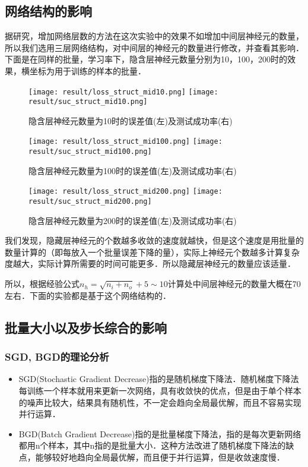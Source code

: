 \documentclass{article}
\begin{document}
  \subsection{网络结构的影响}
  据研究，增加网络层数的方法在这次实验中的效果不如增加中间层神经元的数量，所以我们选用三层网络结构，对中间层的神经元的数量进行修改，并查看其影响．下面是在同样的批量，学习率下，隐含层神经元数量分别为10，100，200时的效果，横坐标为用于训练的样本的批量．

  \begin{figure}
    \centering
    \texttt{[image: result/loss\_struct\_mid10.png]}
    \texttt{[image: result/suc\_struct\_mid10.png]}
    \caption{隐含层神经元数量为10时的误差值(左)及测试成功率(右)}
  \end{figure}
  \begin{figure}
    \centering
    \texttt{[image: result/loss\_struct\_mid100.png]}
    \texttt{[image: result/suc\_struct\_mid100.png]}
    \caption{隐含层神经元数量为100时的误差值(左)及测试成功率(右)}
  \end{figure}
  \begin{figure}
    \centering
    \texttt{[image: result/loss\_struct\_mid200.png]}
    \texttt{[image: result/suc\_struct\_mid200.png]}
    \caption{隐含层神经元数量为200时的误差值(左)及测试成功率(右)}
  \end{figure}
  \restoregeometry

  我们发现，隐藏层神经元的个数越多收敛的速度就越快，但是这个速度是用批量的数量计算的（即每放入一个批量误差下降的量），实际上神经元个数越多计算复杂度越大，实际计算所需要的时间可能更多．所以隐藏层神经元的数量应该适量．

  所以，根据经验公式$n_h = \sqrt{n_i + n_o} + 5\sim10$计算处中间层神经元的数量大概在70左右．下面的实验都是基于这个网络结构的．


  \subsection{批量大小以及步长综合的影响}

  \subsubsection{SGD, BGD的理论分析}

  \begin{itemize}
    \item SGD(Stochastic Gradient Decrease)指的是随机梯度下降法．随机梯度下降法每训练一个样本就用来更新一次网络，具有收敛快的优点，但是由于单个样本的噪声比较大，结果具有随机性，不一定会趋向全局最优解，而且不容易实现并行运算．

    \item BGD(Batch Gradient Decrease)指的是批量梯度下降法，指的是每次更新网络都用n个样本，其中n指的是批量大小．这种方法改进了随机梯度下降法的缺点，能够较好地趋向全局最优解，而且便于并行运算，但是收敛速度慢．
  \end{itemize}
\end{document}
